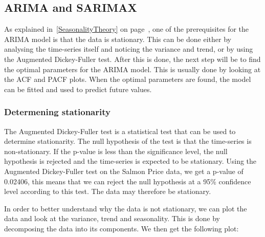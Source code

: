 \subsection{ARIMA and SARIMAX}

As explained in~\ref{SeasonalityTheory} on page~\pageref{SeasonalityTheory}, one of the prerequisites for the ARIMA model is that the data is stationary. This can be done either by analysing the time-series itself and noticing the variance and trend, or by using the Augmented Dickey-Fuller test. 
After this is done, the next step will be to find the optimal parameters for the ARIMA model. This is usually done by looking at the ACF and PACF plots. 
When the optimal parameters are found, the model can be fitted and used to predict future values. \parencite{hyndman_athanasopoulos_2021}

\subsubsection{Determening stationarity}\label{DeterminingStationarity}
The Augmented Dickey-Fuller test is a statistical test that can be used to determine stationarity. The null hypothesis of the test is that the time-series is non-stationary. If the p-value is less than the significance level, the null hypothesis is rejected and the time-series is expected to be stationary.
Using the Augmented Dickey-Fuller test on the Salmon Price data, we get a p-value of 0.02406, this means that we can reject the null hypothesis at a 95\% confidence level according to this test. The data may therefore be stationary.~\parencite{Dickey_Fuller1979}

In order to better understand why the data is not stationary, we can plot the data and look at the variance, trend and seasonality. This is done by decomposing the data into its components. We then get the following plot: 

